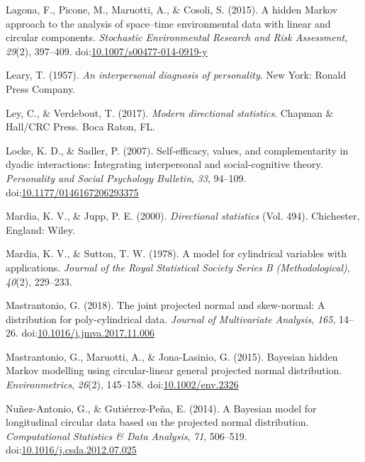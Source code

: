 \documentclass[man,mask]{apa6}
\begin{document}
\leavevmode\hypertarget{ref-lagona2015hidden}{}%
Lagona, F., Picone, M., Maruotti, A., \& Cosoli, S. (2015). A hidden Markov approach to the analysis of space--time environmental data with linear and circular components. \emph{Stochastic Environmental Research and Risk Assessment}, \emph{29}(2), 397--409. doi:\href{https://doi.org/10.1007/s00477-014-0919-y}{10.1007/s00477-014-0919-y}

\leavevmode\hypertarget{ref-leary1957}{}%
Leary, T. (1957). \emph{An interpersonal diagnosis of personality}. New York: Ronald Press Company.

\leavevmode\hypertarget{ref-ley2017modern}{}%
Ley, C., \& Verdebout, T. (2017). \emph{Modern directional statistics}. Chapman \& Hall/CRC Press. Boca Raton, FL.

\leavevmode\hypertarget{ref-locke2007selfefficacy}{}%
Locke, K. D., \& Sadler, P. (2007). Self-efficacy, values, and complementarity in dyadic interactions: Integrating interpersonal and social-cognitive theory. \emph{Personality and Social Psychology Bulletin}, \emph{33}, 94--109. doi:\href{https://doi.org/10.1177/0146167206293375}{10.1177/0146167206293375}

\leavevmode\hypertarget{ref-mardia2000directional}{}%
Mardia, K. V., \& Jupp, P. E. (2000). \emph{Directional statistics} (Vol. 494). Chichester, England: Wiley.

\leavevmode\hypertarget{ref-mardia1978model}{}%
Mardia, K. V., \& Sutton, T. W. (1978). A model for cylindrical variables with applications. \emph{Journal of the Royal Statistical Society Series B (Methodological)}, \emph{40}(2), 229--233.

\leavevmode\hypertarget{ref-mastrantonio2018joint}{}%
Mastrantonio, G. (2018). The joint projected normal and skew-normal: A distribution for poly-cylindrical data. \emph{Journal of Multivariate Analysis}, \emph{165}, 14--26. doi:\href{https://doi.org/10.1016/j.jmva.2017.11.006}{10.1016/j.jmva.2017.11.006}

\leavevmode\hypertarget{ref-mastrantonio2015bayesian}{}%
Mastrantonio, G., Maruotti, A., \& Jona-Lasinio, G. (2015). Bayesian hidden Markov modelling using circular-linear general projected normal distribution. \emph{Environmetrics}, \emph{26}(2), 145--158. doi:\href{https://doi.org/10.1002/env.2326}{10.1002/env.2326}

\leavevmode\hypertarget{ref-nunez2014bayesian}{}%
Nuñez-Antonio, G., \& Gutiérrez-Peña, E. (2014). A Bayesian model for longitudinal circular data based on the projected normal distribution. \emph{Computational Statistics \& Data Analysis}, \emph{71}, 506--519. doi:\href{https://doi.org/10.1016/j.csda.2012.07.025}{10.1016/j.csda.2012.07.025}
\end{document}
